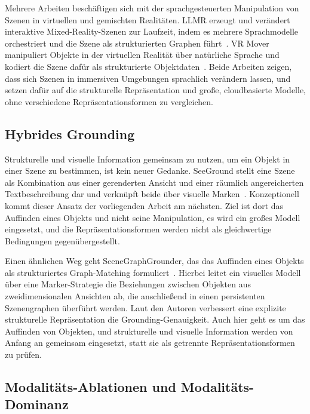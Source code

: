 Mehrere Arbeiten beschäftigen sich mit der sprachgesteuerten Manipulation von Szenen in virtuellen und gemischten Realitäten.
LLMR erzeugt und verändert interaktive Mixed-Reality-Szenen zur Laufzeit, indem es mehrere Sprachmodelle orchestriert und die Szene als strukturierten Graphen führt~\cite{delatorre2024}.
VR Mover manipuliert Objekte in der virtuellen Realität über natürliche Sprache und kodiert die Szene dafür als strukturierte Objektdaten~\cite{wang2025}.
Beide Arbeiten zeigen, dass sich Szenen in immersiven Umgebungen sprachlich verändern lassen, und setzen dafür auf die strukturelle Repräsentation und große, cloudbasierte Modelle, ohne verschiedene Repräsentationsformen zu vergleichen.

\subsection{Hybrides Grounding}

Strukturelle und visuelle Information gemeinsam zu nutzen, um ein Objekt in einer Szene zu bestimmen, ist kein neuer Gedanke.
SeeGround stellt eine Szene als Kombination aus einer gerenderten Ansicht und einer räumlich angereicherten Textbeschreibung dar und verknüpft beide über visuelle Marken~\cite{li2025}.
Konzeptionell kommt dieser Ansatz der vorliegenden Arbeit am nächsten.
Ziel ist dort das Auffinden eines Objekts und nicht seine Manipulation, es wird ein großes Modell eingesetzt, und die Repräsentationsformen werden nicht als gleichwertige Bedingungen gegenübergestellt.

Einen ähnlichen Weg geht SceneGraphGrounder, das das Auffinden eines Objekts als strukturiertes Graph-Matching formuliert~\cite{sun2026}.
Hierbei leitet ein visuelles Modell über eine Marker-Strategie die Beziehungen zwischen Objekten aus zweidimensionalen Ansichten ab, die anschließend in einen persistenten Szenengraphen überführt werden.
Laut den Autoren verbessert eine explizite strukturelle Repräsentation die Grounding-Genauigkeit.
Auch hier geht es um das Auffinden von Objekten, und strukturelle und visuelle Information werden von Anfang an gemeinsam eingesetzt, statt sie als getrennte Repräsentationsformen zu prüfen.

\subsection{Modalitäts-Ablationen und Modalitäts-Dominanz}

